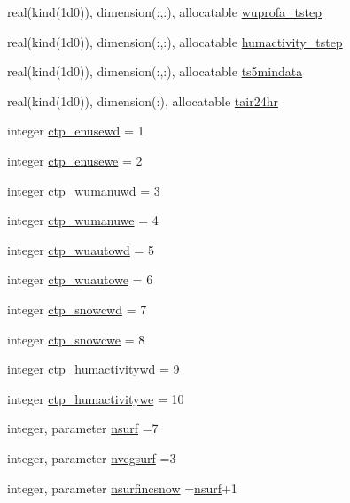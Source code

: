 \begin{DoxyCompactItemize}
\item 
real(kind(1d0)), dimension(\+:,\+:), allocatable \hyperlink{namespaceallocatearray_ab6f942b1808c9a62a4628cbd9e7e34a1}{wuprofa\+\_\+tstep}
\item 
real(kind(1d0)), dimension(\+:,\+:), allocatable \hyperlink{namespaceallocatearray_ae27c6668e2bfb798c38cf0e347949fde}{humactivity\+\_\+tstep}
\item 
real(kind(1d0)), dimension(\+:,\+:), allocatable \hyperlink{namespaceallocatearray_a79aa4fab4188b3e6b7a24b64220153e2}{ts5mindata}
\item 
real(kind(1d0)), dimension(\+:), allocatable \hyperlink{namespaceallocatearray_a763b6159cb62d3d9bdba9505d8729007}{tair24hr}
\item 
integer \hyperlink{namespaceallocatearray_aab05a44c46e86871314b22e0ef8b7cd8}{ctp\+\_\+enusewd} = 1
\item 
integer \hyperlink{namespaceallocatearray_a8600e309a5cc40b15e9d6ed59234d88c}{ctp\+\_\+enusewe} = 2
\item 
integer \hyperlink{namespaceallocatearray_a653dc317607ec2d3939d4d43ca19f3ab}{ctp\+\_\+wumanuwd} = 3
\item 
integer \hyperlink{namespaceallocatearray_ad3747ba618ea8936638fd9932176d53b}{ctp\+\_\+wumanuwe} = 4
\item 
integer \hyperlink{namespaceallocatearray_ac4f67ea2cde8a8c62674b569206a23f4}{ctp\+\_\+wuautowd} = 5
\item 
integer \hyperlink{namespaceallocatearray_aa11b207d82e90d48132f6fece7b41b0b}{ctp\+\_\+wuautowe} = 6
\item 
integer \hyperlink{namespaceallocatearray_a71f069bc1dc0c9fbbd2f1d41c52e680e}{ctp\+\_\+snowcwd} = 7
\item 
integer \hyperlink{namespaceallocatearray_abeccf0f1712b43060c7f0ceb1bc242da}{ctp\+\_\+snowcwe} = 8
\item 
integer \hyperlink{namespaceallocatearray_a6f461398489aaac2f0d3bbeccfaf9b50}{ctp\+\_\+humactivitywd} = 9
\item 
integer \hyperlink{namespaceallocatearray_ac3cf90e10de86031186d0234e35581e2}{ctp\+\_\+humactivitywe} = 10
\item 
integer, parameter \hyperlink{namespaceallocatearray_acd22f92a06f7e9a2a91426b3dc99fdb0}{nsurf} =7
\item 
integer, parameter \hyperlink{namespaceallocatearray_abb987c3b35dd321963fd53d38f10236f}{nvegsurf} =3
\item 
integer, parameter \hyperlink{namespaceallocatearray_af4d113f332b6759cfa22271140c9162d}{nsurfincsnow} =\hyperlink{namespaceallocatearray_acd22f92a06f7e9a2a91426b3dc99fdb0}{nsurf}+1

\end{DoxyCompactItemize}
